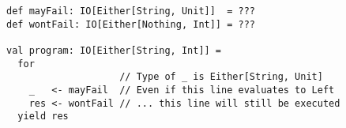 \begin{algorithm}

\begin{verbatim}
def mayFail: IO[Either[String, Unit]]  = ???
def wontFail: IO[Either[Nothing, Int]] = ???

val program: IO[Either[String, Int]] =
  for
                    // Type of _ is Either[String, Unit]
    _   <- mayFail  // Even if this line evaluates to Left
    res <- wontFail // ... this line will still be executed
  yield res
\end{verbatim}

\caption{Subtle bugs not causing early termination or compilation error. %
\label{monadtransformer:subtle-bugs}}
\end{algorithm}